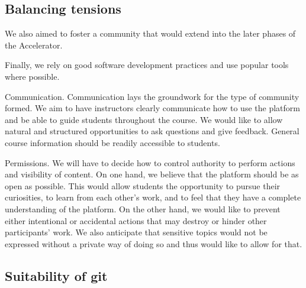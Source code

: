 \documentclass[12pt,twoside,vi]{mitthesis}
\begin{document}
\subsection{Balancing tensions}

We also aimed to foster a community that would extend into the later phases of the Accelerator. 

Finally, we rely on good software development practices and use popular tools where possible.

Communication. Communication lays the groundwork for the type of community formed. We aim to have instructors clearly communicate how to use the platform and be able to guide students throughout the course. We would like to allow natural and structured opportunities to ask questions and give feedback. General course information should be readily accessible to students.

Permissions. We will have to decide how to control authority to perform actions and visibility of content. On one hand, we believe that the platform should be as open as possible. This would allow students the opportunity to pursue their curiosities, to learn from each other’s work, and to feel that they have a complete understanding of the platform. On the other hand, we would like to prevent either intentional or accidental actions that may destroy or hinder other participants’ work. We also anticipate that sensitive topics would not be expressed without a private way of doing so and thus would like to allow for that.

\subsection{Suitability of git}
\end{document}
